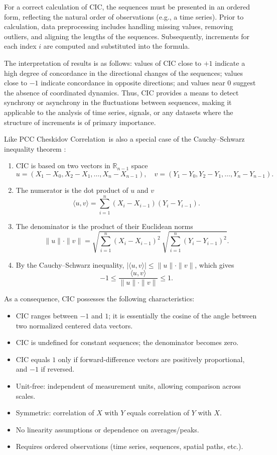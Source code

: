\documentclass[aos]{imsart}
\newcommand{\cic}{\text{CIC}}
\newcommand{\cicFull}{\textnormal{Cheskidov Correlation}}
\newcommand{\pcc}{\text{PCC}}
\begin{document}
For a correct calculation of $\cic$, the sequences must be presented in an ordered form, reflecting the natural order of observations (e.g., a time series). Prior to calculation, data preprocessing includes handling missing values, removing outliers, and aligning the lengths of the sequences. Subsequently, increments for each index $i$ are computed and substituted into the formula.

The interpretation of results is as follows: values of $\cic$ close to $+1$ indicate a high degree of concordance in the directional changes of the sequences; values close to $-1$ indicate concordance in opposite directions; and values near $0$ suggest the absence of coordinated dynamics. Thus, $\cic$ provides a means to detect synchrony or asynchrony in the fluctuations between sequences, making it applicable to the analysis of time series, signals, or any datasets where the structure of increments is of primary importance.

Like $\pcc$ \cicFull\ is also a special case of the Cauchy\allowbreak--\allowbreak Schwarz inequality theorem \cite{r3}:
\begin{enumerate}
\item $\cic$ is based on two vectors in $\mathbb{R}_{n-1}$ space
\[
u = (X_1-X_0, X_2-X_1, \dots, X_n-X_{n-1}), \quad
v = (Y_1-Y_0, Y_2-Y_1, \dots, Y_n-Y_{n-1}).
\]
\item The numerator is the dot product of $u$ and $v$
\[
\langle u,v \rangle = \sum_{i=1}^n (X_i - X_{i-1})(Y_i - Y_{i-1}).
\]
\item The denominator is the product of their Euclidean norms
\[
\|u\| \cdot \|v\| = \sqrt{\sum_{i=1}^n (X_i - X_{i-1})^2} \, \sqrt{\sum_{i=1}^n (Y_i - Y_{i-1})^2}.
\]
\item By the Cauchy–Schwarz inequality, $|\langle u,v \rangle| \le \|u\|\cdot \|v\|$, which gives
\[
-1 \le \frac{\langle u,v \rangle}{\|u\|\cdot \|v\|} \le 1.
\]
\end{enumerate}

As a consequence, $\cic$ possesses the following characteristics:
\begin{itemize}
\item $\cic$ ranges between $-1$ and $1$; it is essentially the cosine of the angle between two normalized centered data vectors.
\item $\cic$ is undefined for constant sequences; the denominator becomes zero.
\item $\cic$ equals $1$ only if forward-difference vectors are positively proportional, and $-1$ if reversed.
\item Unit-free: independent of measurement units, allowing comparison across scales.
\item Symmetric: correlation of $X$ with $Y$ equals correlation of $Y$ with $X$.
\item No linearity assumptions or dependence on averages/peaks.
\item Requires ordered observations (time series, sequences, spatial paths, etc.).
\end{itemize}
\end{document}
